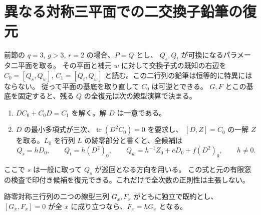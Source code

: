 \section{異なる対称三平面での二交換子鉛筆の復元}
\label{sec:marked-two-commutators}
\begin{theorem}\label{thm:marked-two-commutators}
前節の $q=3$, $g>3$, $r=2$ の場合、$P=Q$ とし、
$Q_s,Q_t$ が可換になるパラメータ二平面を取る。
その平面と補元 $w$ に対して交換子式の既知の右辺を
$C_0=[Q_s,Q_w]$, $C_1=[Q_t,Q_w]$ と読む。この二行列の鉛筆は恒等的に特異にはならない。
従って平面の基底を取り直して $C_0$ は可逆とできる。
$G,F$ とこの基底を固定すると、残る $Q$ の全復元は次の線型演算で決まる。
\begin{enumerate}
\item $D C_0+C_0 D=C_1$ を解く。解 $D$ は一意である。
\item $D$ の最小多項式が三次、$\operatorname{tr}(D^2 C_0)=0$ を要求し、
$[D,Z]=C_0$ の一解 $Z$ を取る。$L_0$ を行列 $L$ の跡零部分と書くと、全候補は
\[
 Q_s=h D_0,\qquad Q_t=h(D^2)_0,\qquad
 Q_w=h^{-1} Z_0+eD_0+f(D^2)_0,\qquad h\ne0 .
\]
\end{enumerate}
ここで $s$ は一般に取って $Q_s$ が巡回となる方向を用いる。
この式と元の有限窓の検査で印付き候補を復元できる。これだけで全次数の正則性は主張しない。
\end{theorem}
\begin{lemma}\label{lem:commuting-linear-symmetric-nets}
跡零対称三行列の二つの線型三列 $G_x,F_x$ がともに独立で既約とし、
$[G_x,F_x]=0$ が全 $x$ に成り立つなら、$F_x=hG_x$ となる。
\end{lemma}
